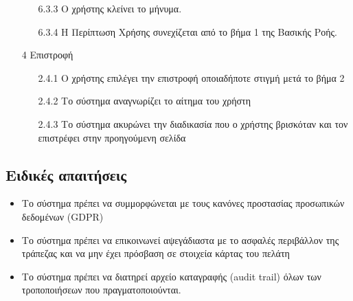 \documentclass[12pt,a4paper,twoside]{book}
\begin{document}
\begin{enumerate}
\begin{enumerate}
          \item[6.3.3 ] Ο χρήστης κλείνει το μήνυμα. %
          \item[6.3.4 ] Η Περίπτωση Χρήσης συνεχίζεται από το βήμα 1 της Βασικής Ροής. %
        \end{enumerate}
  \item[4 ] Επιστροφή
        \begin{enumerate}
          \item[2.4.1 ] Ο χρήστης επιλέγει την επιστροφή οποιαδήποτε στιγμή μετά το βήμα 2 %
          \item[2.4.2 ] Το σύστημα αναγνωρίζει το αίτημα του χρήστη %
          \item[2.4.3 ] Το σύστημα ακυρώνει την διαδικασία που ο χρήστης βρισκόταν και τον επιστρέφει στην προηγούμενη σελίδα %
        \end{enumerate}
\end{enumerate}

\subsection{Ειδικές απαιτήσεις} %
\begin{itemize}
  \item Το σύστημα πρέπει να συμμορφώνεται με τους κανόνες προστασίας προσωπικών δεδομένων (GDPR)  %
  \item Το σύστημα πρέπει να επικοινωνεί αψεγάδιαστα με το ασφαλές περιβάλλον της τράπεζας και να μην έχει πρόσβαση σε στοιχεία κάρτας του πελάτη   %
  \item Το σύστημα πρέπει να διατηρεί αρχείο καταγραφής (audit trail) όλων των τροποποιήσεων που πραγματοποιούνται. %
\end{itemize}
\end{document}
